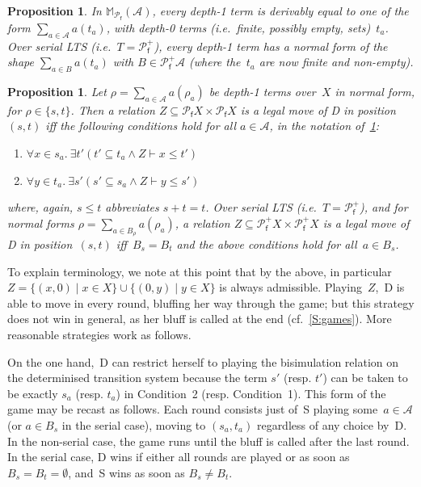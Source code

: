 \documentclass[sigconf,
			final%
			nonacm
                        ]{acmart}
\numberwithin{equation}{section}
\numberwithin{equation}{section}
\theoremstyle{plain}
\newtheorem{propn}[thm]{Proposition}
\theoremstyle{definition}
\newcommand{\M}{\mathbb{M}}                   %
\newcommand{\A}{\mathcal{A}}            %
\newcommand{\pow}{\mathscr P}              %
\newcommand{\powf}{\pow_{\mathsf f}}
\begin{document}
\begin{propn}\label{prop:trace-nf}
  In $\M_{\powf}(\A)$, every depth-1 term is derivably equal to one of
  the form $\sum_{a\in \A}a (t_{a})$, with depth-0 terms (i.e.~finite,
  possibly empty, sets)~$t_{a}$. Over serial LTS (i.e.~$T=\powf^+$),
  every depth-1 term has a normal form of the shape
  $\sum_{a\in B}a (t_{a})$ with $B\in\powf^+\A$ (where the~$t_a$ are
  now finite and non-empty).
\end{propn}
\begin{propn}\label{prop:WStratTrace}
  Let $\rho=\sum_{a\in\A} a(\rho_a)$ be depth-1 terms over~$X$ in
  normal form, for $\rho\in\{s,t\}$. Then a relation
  $Z\subseteq \powf X\times\powf X$
  is a legal move of D in position $(s,t)$ iff
  the following conditions hold for all $a\in\A$, in the notation
  of~\cref{prop:trace-nf}:
  \begin{enumerate}
    \item $\forall x\in s_{a}.\ \exists {t'}(t'\subseteq t_{a} \land Z\vdash x\leq t')$
    \item $\forall {y\in t_{a}}.\ \exists {s'}(s'\subseteq s_{a} \land Z\vdash y\leq s')$
  \end{enumerate}
  where, again, $s\leq t$ abbreviates $s+ t=t$. Over serial LTS
  (i.e.~$T=\powf^+$), and for normal forms
  $\rho=\sum_{a\in B_\rho} a(\rho_a)$, a relation
  $Z\subseteq \powf^+X \times \powf^+X$
  is a legal move of D in position~$(s,t)$
  iff~$B_s=B_t$ and the above conditions hold for all~$a\in B_s$.
\end{propn}
\noindent To explain terminology, we note at this point that by the
above, in particular $Z=\{(x,0)\mid x\in X\}\cup\{(0,y)\mid y\in X\}$
is always admissible. Playing~$Z$,~D is able to move in every
round, bluffing her way through the game; but this strategy does not
win in general, as her bluff is called at the end
(cf.~\cref{S:games}). More reasonable strategies work as follows.

On the one hand,~D can restrict herself to playing the bisimulation
relation on the determinised transition system because the term $s'$
(resp. $t'$) can be taken to be exactly $s_a$ (resp. $t_a$) in
Condition~2 (resp. Condition~1). This form of the game may be recast
as follows. Each round consists just of~S playing some~$a\in\A$ (or
$a\in B_s$ in the serial case), moving to $(s_a,t_a)$ regardless of
any choice by~D. In the non-serial case, the game runs until the bluff
is called after the last round. In the serial case, D wins if either
all rounds are played or as soon as~$B_s=B_t=\emptyset$, and~S wins as
soon as $B_s\neq B_t$.
\end{document}
